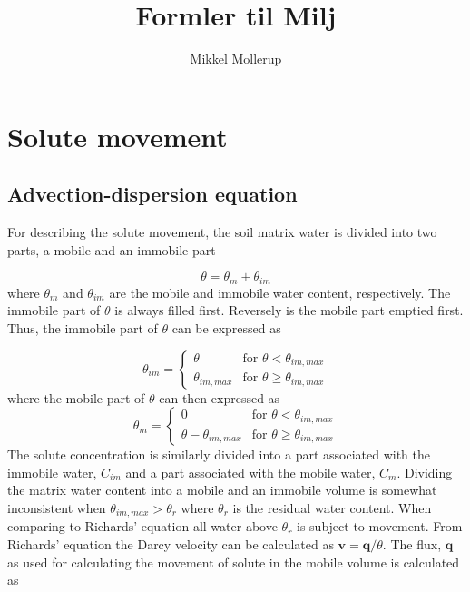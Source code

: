 \documentclass{report}
\begin{document}
%
%


\title{Formler til Milj\ostyrrelsen}

%
%

\author{Mikkel Mollerup}



\chapter{Solute movement}

\section{Advection-dispersion equation}

For describing the solute movement, the soil matrix water is divided
into two parts, a mobile and an immobile part

\begin{equation}
\theta= \theta_{m} + \theta_{im}
\end{equation}
%
where $\theta_{m}$ and $\theta_{im}$ are the mobile and immobile
water content, respectively. The immobile part of $\theta$ is always
filled first. Reversely is the mobile part emptied first. Thus, the
immobile part of $\theta$ can be expressed as

\begin{equation}
\theta_{im}=
\begin{cases}
\theta & \text{for\ } \theta < \theta_{im,max} \\
\theta_{im,max} & \text{for\ } \theta \geq \theta_{im,max}
\end{cases}
\end{equation}
%
where the mobile part of $\theta$ can then expressed as
%
\begin{equation}
\theta_{m}=
\begin{cases}
 0 & \text{for\ } \theta < \theta_{im,max} \\
\theta -\theta_{im,max} & \text{for\ } \theta \geq \theta_{im,max}
\end{cases}
\end{equation}
%
The solute concentration is similarly divided into a part associated
with the immobile water, $C_{im}$ and a part associated with the
mobile water, $C_{m}$. Dividing the matrix water content into a
mobile and an immobile volume is somewhat inconsistent when
$\theta_{im,max}>\theta_r$ where $\theta_r$ is the residual water
content. When comparing to Richards' equation all water above
$\theta_r$ is subject to movement. From Richards' equation the Darcy
velocity can be calculated as $\mathbf{v}=\mathbf{q}/\theta$. The
flux, $\mathbf{q}$ as used for calculating the movement of solute in
the mobile volume is calculated as
\end{document}
